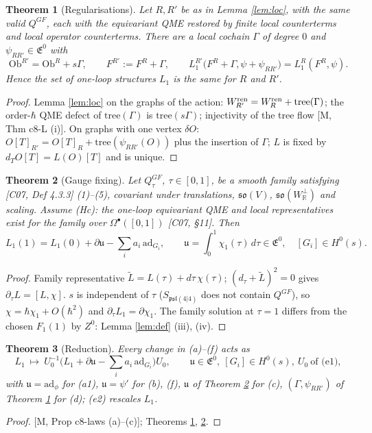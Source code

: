 \documentclass[10pt]{article}
\newtheorem{theorem}{Theorem}[section]
\theoremstyle{definition}
\newcommand{\pl}{\mathfrak{psl}(4|4)}
\newcommand{\E}{\mathfrak E}
\newcommand{\ad}{\mathrm{ad}}
\newcommand{\Ob}{\mathrm{Ob}}
\newcommand{\Wp}{W_{\mathbb R}^\perp}
\begin{document}
\begin{theorem}[Regularisations]\label{thm:reg}
Let $R,R'$ be as in Lemma \ref{lem:loc}, with the same valid $Q^{GF}$, each with the equivariant QME restored by finite local counterterms and local operator counterterms. There are a local cochain $\Gamma$ of degree $0$ and $\psi_{RR'}\in\E^0$ with
\[
\Ob^{R'}=\Ob^R+s\Gamma,\qquad F^{R'}:=F^R+\Gamma,\qquad L_1^{R'}\big(F^R+\Gamma,\psi+\psi_{RR'}\big)=L_1^R(F^R,\psi).
\]
Hence the set of one-loop structures $L_1$ is the same for $R$ and $R'$.
\end{theorem}
\begin{proof}
Lemma \ref{lem:loc} on the graphs of the action: $W^{\rm ren}_{R'}=W^{\rm ren}_R+\mathrm{tree}(\Gamma)$; the order-$\hbar$ QME defect of $\mathrm{tree}(\Gamma)$ is $\mathrm{tree}(s\Gamma)$; injectivity of the tree flow [M, Thm c8-L (i)]. On graphs with one vertex $\delta O$: $O[T]_{R'}=O[T]_R+\mathrm{tree}(\psi_{RR'}(O))$ plus the insertion of $\Gamma$; $L$ is fixed by $d_TO[T]=L(O)[T]$ and is unique.
\end{proof}

\begin{theorem}[Gauge fixing]\label{thm:gf}
Let $Q^{GF}_\tau$, $\tau\in[0,1]$, be a smooth family satisfying [C07, Def 4.3.3] (1)--(5), covariant under translations, $\mathfrak{so}(V)$, $\mathfrak{so}(\Wp)$ and scaling. Assume (Hc): the one-loop equivariant QME and local representatives exist for the family over $\Omega^\bullet([0,1])$ [C07, \S11]. Then
\[
L_1(1)=L_1(0)+\partial\mathfrak u-\textstyle\sum_ia_i\,\ad_{G_i},\qquad \mathfrak u=\int_0^1\chi_1(\tau)\,d\tau\in\E^0,\quad [G_i]\in H^0(s).
\]
\end{theorem}
\begin{proof}
Family representative $\tilde L=L(\tau)+d\tau\,\chi(\tau)$; $(d_\tau+\tilde L)^2=0$ gives $\partial_\tau L=[L,\chi]$. $s$ is independent of $\tau$ ($S_{\pl}$ does not contain $Q^{GF}$), so $\chi=\hbar\chi_1+O(\hbar^2)$ and $\partial_\tau L_1=\partial\chi_1$. The family solution at $\tau=1$ differs from the chosen $F_1(1)$ by $Z^0$: Lemma \ref{lem:def} (iii), (iv).
\end{proof}

\begin{theorem}[Reduction]\label{thm:red}
Every change in (a)--(f) acts as
\[
L_1\ \longmapsto\ U_0^{-1}\Big(L_1+\partial\mathfrak u-\textstyle\sum_ia_i\,\ad_{G_i}\Big)U_0,\qquad \mathfrak u\in\E^0,\ [G_i]\in H^0(s),\ U_0\ \text{of (e1)},
\]
with $\mathfrak u=\ad_\phi$ for (a1), $\mathfrak u=\psi'$ for (b), (f), $\mathfrak u$ of Theorem \ref{thm:gf} for (c), $(\Gamma,\psi_{RR'})$ of Theorem \ref{thm:reg} for (d); (e2) rescales $L_1$.
\end{theorem}
\begin{proof}{}[M, Prop c8-laws (a)--(c)]; Theorems \ref{thm:reg}, \ref{thm:gf}.
\end{proof}
\end{document}

